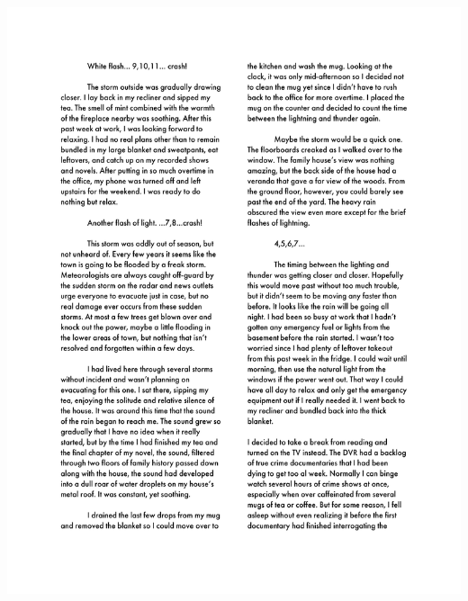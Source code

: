 \newpage
\begin{center}
     \includegraphics[scale=0.75]{Scores/Raindrops Text_Part1.pdf}
\end{center}
\newpage
